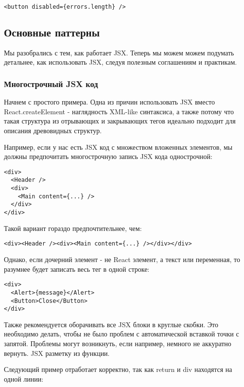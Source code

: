 \documentclass[12pt]{book}
\begin{document}
\begin{lstlisting}
<button disabled={errors.length} />
\end{lstlisting}

\subsection*{Основные паттерны}

Мы разобрались с тем, как работает JSX. Теперь мы можем можем подумать детальнее, как использовать JSX, следуя полезным соглашениям и практикам.

\subsubsection*{Многострочный JSX код}

Начнем с простого примера. Одна из причин использовать JSX вместо React.createElement - наглядность XML-like синтаксиса, а также потому что такая структура из отрывающих и закрывающих тегов идеально подходит для описания древовидных структур.

Например, если у нас есть JSX код с множеством вложенных элементов, мы должны предпочитать многострочную запись JSX кода однострочной:

\begin{lstlisting}
<div>
  <Header />
  <div>
    <Main content={...} />
  </div>
</div>
\end{lstlisting}

Такой вариант гораздо предпочтительнее, чем:

\begin{lstlisting}
<div><Header /><div><Main content={...} /></div></div>
\end{lstlisting}

Однако, если дочерний элемент - не React элемент, а текст или переменная, то разумнее будет записать весь тег в одной строке:

\begin{lstlisting}
<div>
  <Alert>{message}</Alert>
  <Button>Close</Button>
</div>
\end{lstlisting}

Также рекомендуется оборачивать все JSX блоки в круглые скобки. Это необходимо делать, чтобы не было проблем с автоматической вставкой точки с запятой. Проблемы могут возникнуть, если например, немного не аккуратно вернуть. JSX разметку из функции.

Следующий пример отработает корректно, так как return и div находятся на одной линии:
\end{document}
